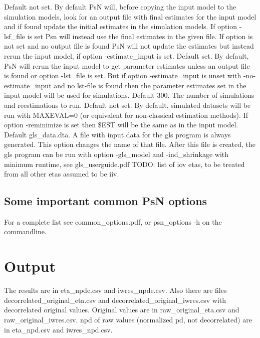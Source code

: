 \begin{optionlist}
Default not set. By default PsN will, before copying the input model to the simulation models, look for an output file with final estimates for the input model and if found update the initial estimates in the simulation models. If option -lsf\_file is set Psn will instead use the final estimates in the given file. If option is not set and no output file is found PsN will not update the estimates but instead rerun the input model, if option -estimate\_input is set. 
\nextopt
{}
Default set. By default, PsN will rerun the input model to get parameter estimates unless an output file is found or option -lst\_file is set. But if option -estimate\_input is unset with -no-estimate\_input and no lst-file is found then the parameter estimates set in the input model will be used for simulations. 
\nextopt
{}
Default 300. The number of simulations and reestimations to run. 
\nextopt
{}
Default not set. By default, simulated datasets will be run with MAXEVAL=0 (or equivalent for non-classical estimation methods). If option -reminimize is set then \$EST will be the same as in the input model. 
\nextopt
{}
Default gls\_data.dta. A file with input data for the gls program is always generated. This option changes the name of that file. After this file is created, the gls program can be run with option \mbox{-gls\_model} and -ind\_shrinkage with minimum runtime, see gls\_userguide.pdf 
\nextopt
{}
TODO: list of iov etas, to be treated from all other etas assumed to be iiv. 
\nextopt
\end{optionlist}



\subsection{Some important common PsN options}
For a complete list see common\_options.pdf, 
or psn\_options -h on the commandline.




\section{Output}

The results are in eta\_npde.csv and iwres\_npde.csv. Also there are files decorrelated\_original\_eta.csv and decorrelated\_original\_iwres.csv with decorrelated original values. Original values are in raw\_original\_eta.csv and raw\_original\_iwres.csv. npd of raw values (normalized pd, not decorrelated) are in eta\_npd.csv and iwres\_npd.csv.

